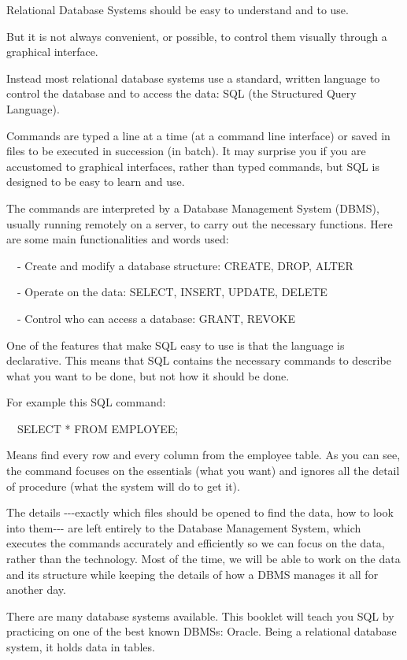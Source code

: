 Relational Database Systems should be easy to understand and to use.

But it is not always convenient, or possible, to control them visually through a graphical interface.

Instead most relational database systems use a standard, written language to control the database and to access the data: SQL (the {\textquotedbl}Structured Query Language{\textquotedbl}).

Commands are typed a line at a time (at a {\textquotedbl}command line interface{\textquotedbl}) or saved in files to be executed in succession (in {\textquotedbl}batch{\textquotedbl}). It may surprise you if you are accustomed to graphical interfaces, rather than typed commands, but SQL is designed to be easy to learn and use.

The commands are interpreted by a Database Management System (DBMS), usually running remotely on a server, to carry out the necessary functions. Here are some main functionalities and words used:

\ \ {}- Create and modify a database structure: CREATE, DROP, ALTER

\ \ {}- Operate on the data: SELECT, INSERT, UPDATE, DELETE 

\ \ {}- Control who can access a database: GRANT, REVOKE

One of the features that make SQL easy to use is that the language is declarative. This means that SQL contains the necessary commands to describe what you want to be done, but not how it should be done.

For example this SQL command:

\ \ SELECT * FROM EMPLOYEE;

Means {\textquotedbl}find every row and every column from the employee table{\textquotedbl}. As you can see, the command focuses on the essentials (what you want) and ignores all the detail of procedure (what the system will do to get it).

The details -{}-{}-exactly which files should be opened to find the data, how to look into them-{}-{}- are left entirely to the Database Management System, which executes the commands accurately and efficiently so we can focus on the data, rather than the technology. Most of the time, we will be able to work on the data and its structure while keeping the details of how a DBMS manages it all for another day.

There are many database systems available. This booklet will teach you SQL by practicing on one of the best known DBMSs: Oracle. Being a relational database system, it holds data in tables.

